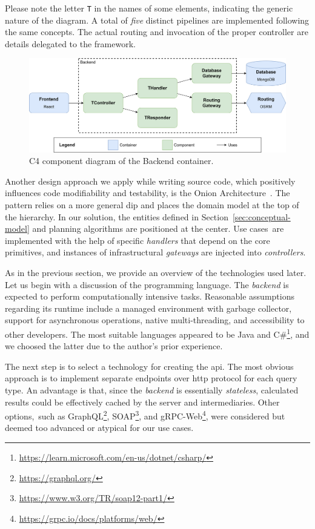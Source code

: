 Please note the letter \texttt{T} in the names of some elements, indicating the generic nature of the diagram. A total of \emph{five} distinct pipelines are implemented following the same concepts. The actual routing and invocation of the proper controller are details delegated to the framework.

\begin{figure}[h!]
\centering
\includegraphics[width=\linewidth]{img/design/c4-component-diagram-backend.png}
\caption{C4 component diagram of the Backend container.}
\label{fig:c4-component-diagram-backend}
\end{figure}

Another design approach we apply while writing source code, which positively influences code modifiability and testability, is the Onion Architecture~\cite{palermo08}. The pattern relies on a more general \ac{dip} and places the domain model at the top of the hierarchy. In our solution, the entities defined in Section~\ref{sec:conceptual-model} and planning algorithms are positioned at the center. Use cases~are implemented with the help of specific \emph{handlers} that depend on the core primitives, and instances of infrastructural \emph{gateways} are injected into \emph{controllers}.

As in the previous section, we provide an overview of the technologies used later. Let us begin with a discussion of the programming language. The \emph{backend} is expected to perform computationally intensive tasks. Reasonable assumptions regarding its runtime include a managed environment with garbage collector, support for asynchronous operations, native multi-threading, and accessibility to other developers. The most suitable languages appeared to be Java and C\#\footnote{\href{https://learn.microsoft.com/en-us/dotnet/csharp/}{https://learn.microsoft.com/en-us/dotnet/csharp/}}, and we choosed the latter due to the author's prior experience.

The next step is to select a technology for creating the \acs{api}. The most ob\-vi\-ous approach is to implement separate endpoints over \acs{http} protocol for each query type. An advantage is that, since the \emph{backend} is essentially \emph{stateless}, calculated results could be effectively cached by the server and intermediaries. Other options,~such as GraphQL\footnote{\href{https://graphql.org/}{https://graphql.org/}}, SOAP\footnote{\href{https://www.w3.org/TR/soap12-part1/}{https://www.w3.org/TR/soap12-part1/}}, and gRPC-Web\footnote{\href{https://grpc.io/docs/platforms/web/}{https://grpc.io/docs/platforms/web/}}, were considered but deemed too advanced or atypical for our use cases.

